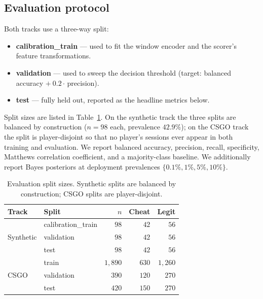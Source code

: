 \documentclass[conference,10pt]{IEEEtran}
\begin{document}
\subsection{Evaluation protocol}

Both tracks use a three-way split:
\begin{itemize}
  \item \textbf{calibration\_train} --- used to fit the window encoder
    and the scorer's feature transformations.
  \item \textbf{validation} --- used to sweep the decision threshold
    (target: balanced accuracy $+\ 0.2\cdot$\,precision).
  \item \textbf{test} --- fully held out, reported as the headline
    metrics below.
\end{itemize}
Split sizes are listed in Table~\ref{tab:splits}. On the synthetic
track the three splits are balanced by construction ($n=98$ each,
prevalence $42.9\%$); on the CSGO track the split is player-disjoint so
that no player's sessions ever appear in both training and evaluation.
We report balanced accuracy, precision, recall, specificity, Matthews
correlation coefficient, and a majority-class baseline. We additionally
report Bayes posteriors at deployment prevalences
$\{0.1\%, 1\%, 5\%, 10\%\}$.

\begin{table}[t]
\caption{Evaluation split sizes. Synthetic splits are balanced by
  construction; CSGO splits are player-disjoint.}
\label{tab:splits}
\centering
\small
\begin{tabular}{@{}llrrr@{}}
\toprule
Track & Split & $n$ & Cheat & Legit \\
\midrule
\multirow{3}{*}{Synthetic} & calibration\_train & $98$   & $42$  & $56$  \\
                           & validation         & $98$   & $42$  & $56$  \\
                           & test               & $98$   & $42$  & $56$  \\
\midrule
\multirow{3}{*}{CSGO}      & train              & $1{,}890$ & $630$ & $1{,}260$ \\
                           & validation         & $390$  & $120$ & $270$  \\
                           & test               & $420$  & $150$ & $270$  \\
\bottomrule
\end{tabular}
\end{table}
\end{document}
